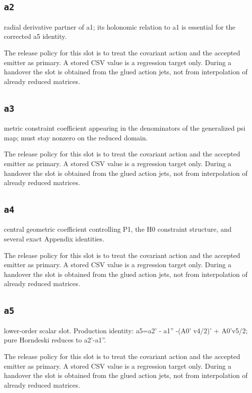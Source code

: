 \documentclass[11pt,a4paper,oneside]{book}
\begin{document}
\subsection{\texttt{a2}}
radial derivative partner of a1; its holonomic relation to a1 is essential for the corrected a5 identity.

The release policy for this slot is to treat the covariant action and the accepted emitter as primary. A stored CSV value is a regression target only. During a handover the slot is obtained from the glued action jets, not from interpolation of already reduced matrices.\par

\subsection{\texttt{a3}}
metric constraint coefficient appearing in the denominators of the generalized psi map; must stay nonzero on the reduced domain.

The release policy for this slot is to treat the covariant action and the accepted emitter as primary. A stored CSV value is a regression target only. During a handover the slot is obtained from the glued action jets, not from interpolation of already reduced matrices.\par

\subsection{\texttt{a4}}
central geometric coefficient controlling P1, the H0 constraint structure, and several exact Appendix identities.

The release policy for this slot is to treat the covariant action and the accepted emitter as primary. A stored CSV value is a regression target only. During a handover the slot is obtained from the glued action jets, not from interpolation of already reduced matrices.\par

\subsection{\texttt{a5}}
lower-order scalar slot. Production identity: a5=a2' - a1'' -(A0' v4/2)' + A0'v5/2; pure Horndeski reduces to a2'-a1''.

The release policy for this slot is to treat the covariant action and the accepted emitter as primary. A stored CSV value is a regression target only. During a handover the slot is obtained from the glued action jets, not from interpolation of already reduced matrices.\par
\end{document}
